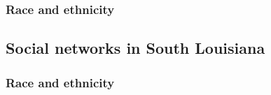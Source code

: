       \subsubsection{Race and ethnicity}
    \subsection{Social networks in South Louisiana}
      \subsubsection{Race and ethnicity}
